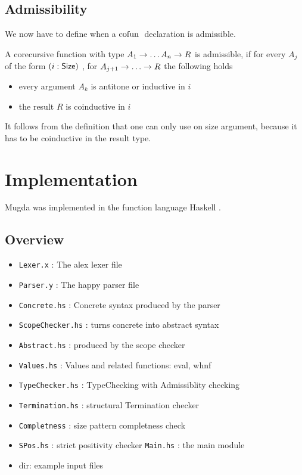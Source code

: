\section{Admissibility}
We now have to define when a $\mathrm{cofun}\;$ declaration is admissible.
\begin{definition}
A corecursive function with type $ A_1 \rightarrow \dots A_n \rightarrow R $ is admissible, if
for every $A_j$ of the form $(i : \mathsf{Size} )$ , for $A_{j + 1} \ra \dots \ra R $ the following holds 
\begin{itemize}
\item
every argument $A_k$ is antitone or inductive in $i$
\item
the result $R$ is coinductive in $i$  
\end{itemize}
\end{definition}
It follows from the definition that one can only use on size argument, because it has to be coinductive in the result type.
\chapter{Implementation}
Mugda was implemented in the function language Haskell \cite{haskell}.
\section{Overview}
\begin{itemize}
\item
\texttt{Lexer.x} : The alex lexer file
\item
\texttt{Parser.y} : The happy parser file
\item
\texttt{Concrete.hs} : Concrete syntax produced by the parser
\item
\texttt{ScopeChecker.hs} : turns concrete into abstract syntax
\item
\texttt{Abstract.hs} : produced by the scope checker
\item
\texttt{Values.hs} : Values and related functions: eval, whnf 
\item
\texttt{TypeChecker.hs} : TypeChecking with Admissiblity checking
\item
\texttt{Termination.hs} : structural Termination checker
\item
\texttt{Completness} : size pattern completness check
\item
\texttt{SPos.hs} : strict positivity checker
\texttt{Main.hs} : the main module
\item
{} dir: example input files
\end{itemize}

